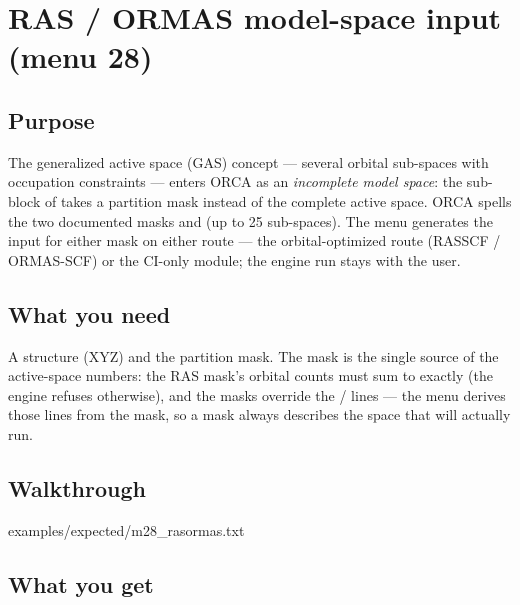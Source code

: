 \chapter{RAS / ORMAS model-space input (menu 28)}
\label{ch:menu28}

\section{Purpose}

The generalized active space (GAS) concept --- several orbital sub-spaces
with occupation constraints --- enters ORCA as an \emph{incomplete model
space}: the  sub-block of  takes a partition mask
instead of the complete active space.  ORCA spells the two documented masks
 and
 (up to 25 sub-spaces).
The menu generates the input for either mask on either route --- the
orbital-optimized  route (RASSCF / ORMAS-SCF) or the
CI-only  module; the engine run stays with the user.

\section{What you need}

A structure (XYZ) and the partition mask.  The mask is the single source of
the active-space numbers: the RAS mask's orbital counts must sum to
 exactly (the engine refuses otherwise), and the masks override
the / lines --- the menu derives those lines from the
mask, so a mask always describes the space that will actually run.

\section{Walkthrough}


  {examples/expected/m28_rasormas.txt}

\section{What you get}

